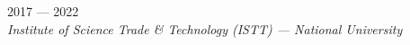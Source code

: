 
 \hfill  2017 --- 2022 \\
\textit{Institute of Science Trade \& Technology (ISTT) — National University}	



